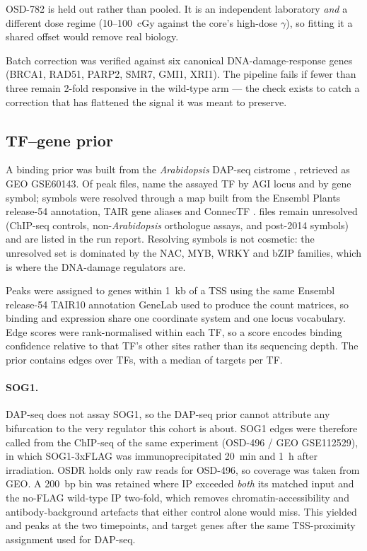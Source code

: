 OSD-782 is held out rather than pooled. It is an independent laboratory \emph{and} a
different dose regime (10--100~cGy against the core's high-dose $\gamma$), so fitting it a
shared offset would remove real biology.

Batch correction was verified against six canonical DNA-damage-response genes
(BRCA1, RAD51, PARP2, SMR7, GMI1, XRI1). The pipeline fails if fewer than three remain
2-fold responsive in the wild-type arm --- the check exists to catch a correction that has
flattened the signal it was meant to preserve.

\subsection{TF--gene prior}

A binding prior was built from the \textit{Arabidopsis} DAP-seq cistrome
\citep{omalley2016cistrome}, retrieved as GEO GSE60143. Of \NumDapseqPeakFiles{} peak
files, \NumDapseqResolvedByAGI{} name the assayed TF by AGI locus and
\NumDapseqResolvedBySymbol{} by gene symbol; symbols were resolved through a map built
from the Ensembl Plants release-54 annotation, TAIR gene aliases
\citep{berardini2015tair} and ConnecTF \citep{brooks2021connectf}.
\NumDapseqUnresolved{} files remain unresolved (ChIP-seq controls, non-\textit{Arabidopsis}
orthologue assays, and post-2014 symbols) and are listed in the run report. Resolving
symbols is not cosmetic: the unresolved set is dominated by the NAC, MYB, WRKY and bZIP
families, which is where the DNA-damage regulators are.

Peaks were assigned to genes within 1~kb of a TSS using the same Ensembl release-54
TAIR10 annotation GeneLab used to produce the count matrices, so binding and expression
share one coordinate system and one locus vocabulary. Edge scores were rank-normalised
within each TF, so a score encodes binding confidence relative to that TF's other sites
rather than its sequencing depth. The prior contains \NumPriorEdges{} edges over
\NumPriorTFs{} TFs, with a median of \NumPriorMedianTargets{} targets per TF.

\paragraph{SOG1.} DAP-seq does not assay SOG1, so the DAP-seq prior cannot attribute any
bifurcation to the very regulator this cohort is about. SOG1 edges were therefore called
from the ChIP-seq of the same experiment (OSD-496 / GEO GSE112529), in which
SOG1-3xFLAG was immunoprecipitated 20~min and 1~h after irradiation. OSDR holds only raw
reads for OSD-496, so coverage was taken from GEO. A 200~bp bin was retained where IP
exceeded \emph{both} its matched input and the no-FLAG wild-type IP two-fold, which
removes chromatin-accessibility and antibody-background artefacts that either control
alone would miss. This yielded \NumSogOnePeaksTwentyMin{} and \NumSogOnePeaksOneHour{}
peaks at the two timepoints, and \NumSogOneTargets{} target genes after the same
TSS-proximity assignment used for DAP-seq.

